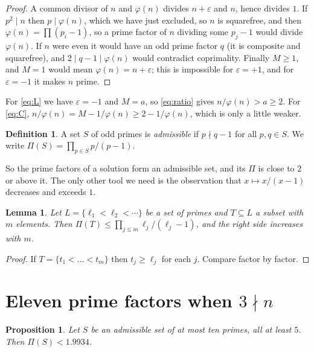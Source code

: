 \documentclass[11pt]{amsart}
\newtheorem{lemma}[theorem]{Lemma}
\newtheorem{proposition}[theorem]{Proposition}
\theoremstyle{definition}
\newtheorem{definition}[theorem]{Definition}
\theoremstyle{remark}
\begin{document}
\begin{proof}
A common divisor of $n$ and $\varphi(n)$ divides $n+\varepsilon$ and $n$,
hence divides $1$. If $p^2\mid n$ then $p\mid\varphi(n)$, which we have
just excluded, so $n$ is squarefree, and then
$\varphi(n)=\prod(p_i-1)$, so a prime factor of $n$ dividing some $p_j-1$
would divide $\varphi(n)$. If $n$ were even it would have an odd prime
factor $q$ (it is composite and squarefree), and $2\mid q-1\mid\varphi(n)$
would contradict coprimality. Finally $M\ge1$, and $M=1$ would mean
$\varphi(n)=n+\varepsilon$; this is impossible for $\varepsilon=+1$, and
for $\varepsilon=-1$ it makes $n$ prime.
\end{proof}

For \eqref{eq:L} we have $\varepsilon=-1$ and $M=a$, so \eqref{eq:ratio}
gives $n/\varphi(n)>a\ge2$. For \eqref{eq:C}, $n/\varphi(n)=M-1/\varphi(n)
\ge2-1/\varphi(n)$, which is only a little weaker.

\begin{definition}
A set $S$ of odd primes is \emph{admissible} if $p\nmid q-1$ for all
$p,q\in S$. We write $\Pi(S)=\prod_{p\in S}p/(p-1)$.
\end{definition}

So the prime factors of a solution form an admissible set, and its
$\Pi$ is close to $2$ or above it. The only other tool we need is the
observation that $x\mapsto x/(x-1)$ decreases and exceeds $1$.

\begin{lemma}\label{lem:mono}
Let $L=\{\ell_1<\ell_2<\cdots\}$ be a set of primes and $T\subseteq L$ a
subset with $m$ elements. Then $\Pi(T)\le\prod_{j\le m}\ell_j/(\ell_j-1)$,
and the right side increases with $m$.
\end{lemma}

\begin{proof}
If $T=\{t_1<\dots<t_m\}$ then $t_j\ge\ell_j$ for each $j$. Compare
factor by factor.
\end{proof}

\section{Eleven prime factors when \texorpdfstring{$3\nmid n$}{3 does not divide n}}\label{sec:eleven}

\begin{proposition}\label{prop:eleven}
Let $S$ be an admissible set of at most ten primes, all at least $5$.
Then $\Pi(S)<1.9934$.
\end{proposition}
\end{document}
